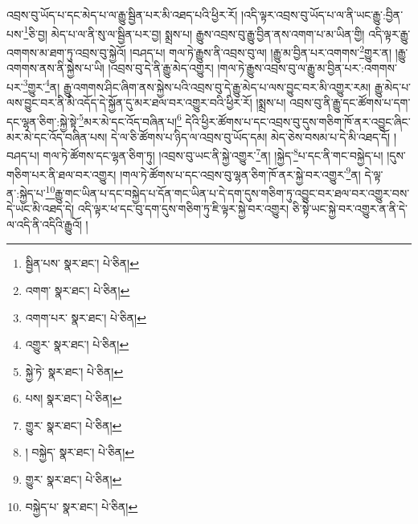 འབྲས་བུ་ཡོད་པ་དང་མེད་པ་ལ་རྒྱུ་སྦྱིན་པར་མི་འཐད་པའི་ཕྱིར་རོ། །འདི་ལྟར་འབྲས་བུ་ཡོད་པ་ལ་ནི་ཡང་རྒྱུ་:བྱིན་པས་\footnote{སྦྱིན་པས་  སྣར་ཐང་།  པེ་ཅིན། }ཅི་བྱ། མེད་པ་ལ་ནི་སུ་ལ་སྦྱིན་པར་བྱ། སྨྲས་པ། རྒྱུས་འབྲས་བུ་རྒྱུ་བྱིན་ནས་འགག་པ་མ་ཡིན་གྱི། འདི་ལྟར་རྒྱུ་འགགས་མ་ཐག་ཏུ་འབྲས་བུ་སྐྱེའོ། །བཤད་པ། གལ་ཏེ་རྒྱུས་ནི་འབྲས་བུ་ལ། །རྒྱུ་མ་བྱིན་པར་འགགས་\footnote{འགག་  སྣར་ཐང་།  པེ་ཅིན། }གྱུར་ན། །རྒྱུ་འགགས་ནས་ནི་སྐྱེས་པ་ཡི། །འབྲས་བུ་དེ་ནི་རྒྱུ་མེད་འགྱུར། །གལ་ཏེ་རྒྱུས་འབྲས་བུ་ལ་རྒྱུ་མ་བྱིན་པར་:འགགས་པར་\footnote{འགག་པར་  སྣར་ཐང་།  པེ་ཅིན། }གྱུར་\footnote{འགྱུར་  སྣར་ཐང་།  པེ་ཅིན། }ན། རྒྱུ་འགགས་ཤིང་ཞིག་ནས་སྐྱེས་པའི་འབྲས་བུ་དེ་རྒྱུ་མེད་པ་ལས་བྱུང་བར་མི་འགྱུར་རམ། རྒྱུ་མེད་པ་ལས་བྱུང་བར་ནི་མི་འདོད་དེ་སྐྱོན་དུ་མར་ཐལ་བར་འགྱུར་བའི་ཕྱིར་རོ། །སྨྲས་པ། འབྲས་བུ་ནི་རྒྱུ་དང་ཚོགས་པ་དག་དང་ལྷན་ཅིག་:སྐྱེ་སྟེ་\footnote{སྐྱེ་ཏེ་  སྣར་ཐང་།  པེ་ཅིན། }མར་མེ་དང་འོད་བཞིན་པ།\footnote{པས།  སྣར་ཐང་།  པེ་ཅིན། } དེའི་ཕྱིར་ཚོགས་པ་དང་འབྲས་བུ་དུས་གཅིག་ཁོ་ནར་འབྱུང་ཞིང་མར་མེ་དང་འོད་བཞིན་པས། དེ་ལ་ཅི་ཚོགས་པ་ཉིད་ལ་འབྲས་བུ་ཡོད་དམ། མེད་ཅེས་བསམ་པ་དེ་མི་འཐད་དོ། །བཤད་པ། གལ་ཏེ་ཚོགས་དང་ལྷན་ཅིག་ཏུ། །འབྲས་བུ་ཡང་ནི་སྐྱེ་འགྱུར་\footnote{གྱུར་  སྣར་ཐང་།  པེ་ཅིན། }ན། །སྐྱེད་\footnote{། བསྐྱེད་  སྣར་ཐང་།  པེ་ཅིན། }པ་དང་ནི་གང་བསྐྱེད་པ། །དུས་གཅིག་པར་ནི་ཐལ་བར་འགྱུར། །གལ་ཏེ་ཚོགས་པ་དང་འབྲས་བུ་ལྷན་ཅིག་ཁོ་ནར་སྐྱེ་བར་འགྱུར་\footnote{གྱུར་  སྣར་ཐང་།  པེ་ཅིན། }ན། དེ་ལྟ་ན་:སྐྱེད་པ་\footnote{བསྐྱེད་པ་  སྣར་ཐང་།  པེ་ཅིན། }རྒྱུ་གང་ཡིན་པ་དང་བསྐྱེད་པ་དོན་གང་ཡིན་པ་དེ་དག་དུས་གཅིག་ཏུ་འབྱུང་བར་ཐལ་བར་འགྱུར་བས་དེ་ཡང་མི་འཐད་དེ། འདི་ལྟར་ཕ་དང་བུ་དག་དུས་གཅིག་ཏུ་ཇི་ལྟར་སྐྱེ་བར་འགྱུར། ཅི་སྟེ་ཡང་སྐྱེ་བར་འགྱུར་ན་ནི་དེ་ལ་འདི་ནི་འདིའི་རྒྱུའོ། །
